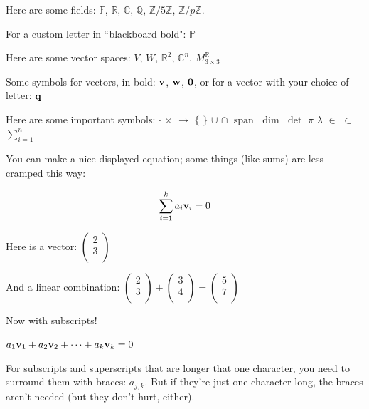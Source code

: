 \documentclass[12pt,letterpaper]{article}
\newcommand{\R}{\mathbb{R}}
\newcommand{\C}{\mathbb{C}}
\newcommand{\F}{\mathbb{F}}
\newcommand{\Z}{\mathbb{Z}}
\newcommand{\Q}{\mathbb{Q}}
\newcommand{\ZF}{\Z/5\Z}
\newcommand{\ZP}{\Z/p\Z}
\newcommand{\vv}{{\bf v}}
\newcommand{\ww}{{\bf w}}
\newcommand{\zv}{{\bf 0}}
\DeclareMathOperator{\Span}{span}
\begin{document}
Here are some fields: $\F$, $\R$, $\C$, $\Q$, $\ZF$, $\ZP$.

For a custom letter in ``blackboard bold": $\mathbb{P}$


Here are some vector spaces: $V$, $W$, $\R^2$, $\C^n$, $M_{3 \times 3}^{\R}$

Some symbols for vectors, in bold: $\vv$, $\ww$, $\zv$, or for a vector with your choice of letter: ${\bf q}$

Here are some important symbols: $\cdot$ $\times$ $\rightarrow$ $\{$ $\}$ $\cup$ $\cap$ $\Span$ %
$\dim$ $\det$ $\pi$ $\lambda$ $\in$ $\subset$ $\sum_{i=1}^n$ 

You can make a nice displayed equation; some things (like sums) are less cramped this way:

\[
\sum_{i=1}^k a_i\vv_i=0
\]

Here is a vector:
$\begin{pmatrix}
2\\
3\\
\end{pmatrix}$

And a linear combination:
$\begin{pmatrix}
2\\
3\\
\end{pmatrix}
+
\begin{pmatrix}
3\\
4\\
\end{pmatrix}
=
\begin{pmatrix}
5\\
7\\
\end{pmatrix}$

Now with subscripts!

$a_1\vv_1+a_2\vv_2+\dots+a_k\vv_k=0$

For subscripts and superscripts that are longer that one character, you need to surround them with braces: $a_{j,k}$. But if they're just one character long, the braces aren't needed (but they don't hurt, either).\\ %
\end{document}
